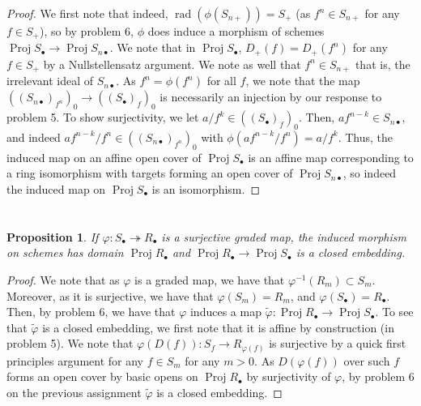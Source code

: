 \documentclass[english,letter,doublesided]{article}
\DeclareMathOperator{\rad}{rad}
\newcommand{\ldt}{\bullet}
\newcommand{\prob}[1]{\setcounter{section}{#1-1}\section{}}
\newtheorem*{prop*}{Proposition}
\theoremstyle{remark}
\theoremstyle{definition}
\DeclareMathOperator{\proj}{Proj}
\newcommand{\tvphi}{{\tilde{\varphi}}}
\begin{document}
\begin{proof} We first note that indeed, $\rad(\phi(S_{n+}))=S_+$ (as $f^n\in S_{n+}$ for any $f\in S_+$), so by problem 6, $\phi$ does induce a morphism of schemes $\proj S_\ldt\to \proj S_{n\ldt}$.
	We note that in $\proj S_\ldt$,  $D_+(f)=D_+(f^n)$ for any $f\in S_+$ by a Nullstellensatz argument. We note as well that $f^n\in S_{n+}$ that is, the irrelevant ideal of $S_{n\ldt}$. As $f^n=\phi(f^n)$ for all $f$, we note that the map $((S_{n\ldt})_{f^n})_0\to ((S_\ldt)_f)_0$ is necessarily an injection by our response to problem 5. To show surjectivity, we let $a/f^k\in ((S_\ldt)_f)_0$. Then, $af^{n-k}\in S_{n\ldt}$, and indeed $af^{n-k}/f^n\in  ((S_{n\ldt})_{f^n})_0$ with $\phi(af^{n-k}/f^n)=a/f^k$. Thus, the induced map on an affine open cover of $\proj S_\ldt$ is an affine map corresponding to a ring isomorphism with targets forming an open cover of $\proj S_{n\ldt}$, so indeed the induced map on $\proj S_\ldt$ is an isomorphism.	\end{proof}
\prob{8}
\begin{prop*}
	If $\varphi:S_\ldt \twoheadrightarrow R_\ldt$ is a surjective graded map, the induced morphism on schemes has domain $\proj R_\ldt$ and $\proj R_\ldt \to \proj S_\ldt$ is a closed embedding.
\end{prop*}
\begin{proof}
We note that as $\varphi$ is a graded map, we have that $\varphi^{-1}(R_m)\subset S_m$. Moreover, as it is surjective, we have that $\varphi(S_m)=R_m$, and $\varphi(S_\ldt)=R_\ldt$. Then, by problem 6, we have that $\varphi$ induces a map $\tvphi:\proj R_\ldt \to \proj S_\ldt$. To see that $\tvphi$ is a closed embedding, we first note that it is affine by construction (in problem 5). We note that $\varphi(D(f)):S_f\to R_{\varphi(f)}$ is surjective by a quick first principles argument for any $f\in S_m$ for any $m>0$. As $D(\varphi(f))$ over such $f$ forms an open cover by basic opens on $\proj R_\ldt$ by surjectivity of $\varphi$, by problem 6 on the previous assignment $\tvphi$ is a closed embedding.
\end{proof}
\end{document}
